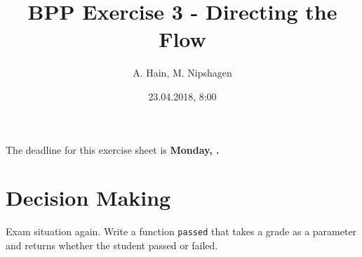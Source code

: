 \documentclass{article}
\title{BPP Exercise 3 - Directing the Flow}
\author{A. Hain, M. Nipshagen}
\date{23.04.2018, 8:00}
\makeatletter
\let\thedate\@date
\makeatother
\begin{document}
The deadline for this exercise sheet is \textbf{Monday, \thedate.}
%
%
\section{Decision Making}
Exam situation again. Write a function \texttt{passed} that takes a grade
as a parameter and returns whether the student passed or failed.
\subsection{}

\subsection{}

\section{}

\subsection{}

\subsection{}
\end{document}
